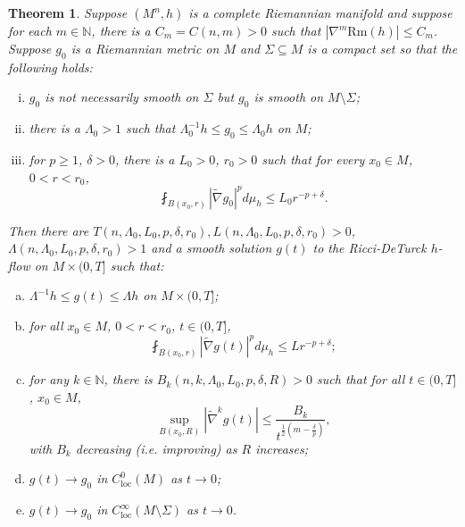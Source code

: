 \documentclass[12pt]{amsart}
\theoremstyle{plain}
\newtheorem{theorem}[subsection]{Theorem}
\theoremstyle{plain}
\theoremstyle{definition}
\theoremstyle{remark}
\numberwithin{equation}{subsection}
\newcommand{\del}{\nabla}
\newcommand{\hdel}{\tilde{\nabla}}
\begin{document}
\begin{theorem}\label{thm:intro-application-1-statement}
    Suppose $(M^n, h)$ is a complete Riemannian manifold and suppose for each $m \in \mathbb{N}$, there is a $C_m = C(n,m) > 0$ such that $|\del^m\text{Rm}(h)| \leq C_m$. Suppose $g_0$ is a Riemannian metric on $M$ and $\Sigma \subseteq M$ is a compact set so that the following holds:
    \begin{enumerate}[(i)]
        \item $g_0$ is not necessarily smooth on $\Sigma$ but $g_0$ is smooth on $M \setminus \Sigma$;
        \item there is a $\Lambda_0 > 1$ such that $\Lambda_0^{-1} h \leq g_0 \leq \Lambda_0 h$ on $M$;
        \item for $p \geq 1$, $\delta > 0$, there is a $L_0 > 0$, $r_0 > 0$ such that for every $x_0 \in M$, $0 < r < r_0$,
        \begin{equation*}
            \fint_{B(x_0,r)} |\hdel g_0|^p d\mu_h \leq L_0 r^{-p+\delta}.
        \end{equation*}
    \end{enumerate}
    Then there are $T(n, \Lambda_0, L_0, p, \delta, r_0), L(n, \Lambda_0, L_0, p, \delta, r_0) > 0$, $ \Lambda(n, \Lambda_0, L_0, p, \delta, r_0) > 1$ and a smooth solution $g(t)$ to the Ricci-DeTurck $h$-flow on $M\times(0,T]$ such that:
        \begin{enumerate}[(a)]
            \item $\Lambda^{-1}h\leq g(t) \leq \Lambda h$ on $M\times(0,T]$;
            \item for all $x_0 \in M$, $0 < r < r_0$, $t \in (0, T]$,
            \begin{equation*}
                \fint_{B(x_0,r)} |\hdel g(t)|^p d\mu_h \leq L r^{-p+\delta};
            \end{equation*}
            \item for any $k \in \mathbb{N}$, there is $B_k(n, k, \Lambda_0, L_0, p, \delta, R) > 0$ such that for all $t \in (0, T]$, $x_0 \in M$,
            \begin{equation*}
                \sup\limits_{B(x_0, R)}|\hdel^k g(t)| \leq \frac{B_k}{t^{\frac{1}{2}(m-\frac{\delta}{p})}},
            \end{equation*}
            with $B_k$ decreasing (i.e. improving) as $R$ increases;
            \item $g(t) \to g_0$ in $C_\text{loc}^0(M)$ as $t \to 0$;
            \item $g(t) \to g_0$ in $C_\text{loc}^\infty(M\setminus\Sigma)$ as $t \to 0$.
        \end{enumerate}
\end{theorem}
\end{document}
